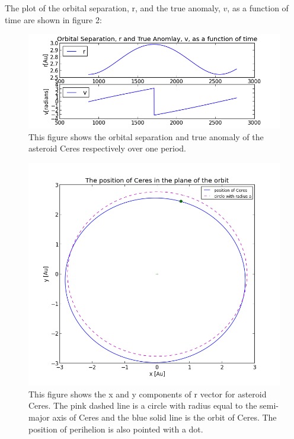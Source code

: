 \documentclass[letterpaper,12pt]{article}
\begin{document}
The plot of the orbital separation, r, and the true anomaly, \begin{math} v \end{math}, as a function of time are shown in figure 2:
\FloatBarrier
\begin{figure}[h!]
\centering
\includegraphics[scale=0.4]{figure4.png}
\caption{This figure shows the orbital separation and true anomaly of the asteroid Ceres respectively over one period.}
\end{figure}
\FloatBarrier



\FloatBarrier
\begin{figure}[h!]
\centering
\includegraphics[scale=0.4]{figure5.png}
\caption{This figure shows the x and y components of r vector for asteroid Ceres. The pink dashed line is a circle with radius equal to the semi-major axis of Ceres and the blue solid line is the orbit of Ceres. The position of perihelion is also pointed with a dot.}
\end{figure}
\FloatBarrier
\end{document}
